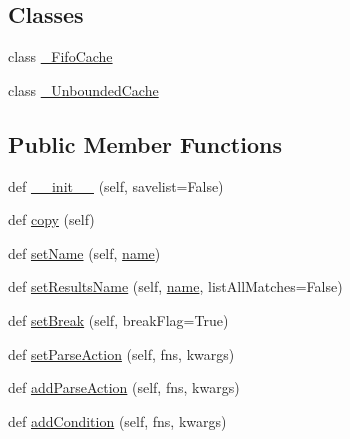 \subsection*{Classes}
\begin{DoxyCompactItemize}
\item 
class \hyperlink{classpip_1_1__vendor_1_1pyparsing_1_1ParserElement_1_1__FifoCache}{\+\_\+\+Fifo\+Cache}
\item 
class \hyperlink{classpip_1_1__vendor_1_1pyparsing_1_1ParserElement_1_1__UnboundedCache}{\+\_\+\+Unbounded\+Cache}
\end{DoxyCompactItemize}
\subsection*{Public Member Functions}
\begin{DoxyCompactItemize}
\item 
def \hyperlink{classpip_1_1__vendor_1_1pyparsing_1_1ParserElement_acee45fab58487158ade314c502148e23}{\+\_\+\+\_\+init\+\_\+\+\_\+} (self, savelist=False)
\item 
def \hyperlink{classpip_1_1__vendor_1_1pyparsing_1_1ParserElement_a75be54cde38c4a6293d9518caf6fc43b}{copy} (self)
\item 
def \hyperlink{classpip_1_1__vendor_1_1pyparsing_1_1ParserElement_a110e6b3f0797a5730f4c0d851314071e}{set\+Name} (self, \hyperlink{classpip_1_1__vendor_1_1pyparsing_1_1ParserElement_a91b7a89a29c2aa6e205a57aad16c8412}{name})
\item 
def \hyperlink{classpip_1_1__vendor_1_1pyparsing_1_1ParserElement_ab7887526af9674a6b7969bd4d9756bf9}{set\+Results\+Name} (self, \hyperlink{classpip_1_1__vendor_1_1pyparsing_1_1ParserElement_a91b7a89a29c2aa6e205a57aad16c8412}{name}, list\+All\+Matches=False)
\item 
def \hyperlink{classpip_1_1__vendor_1_1pyparsing_1_1ParserElement_ac0f15d75e611e997f15adddd10d026ae}{set\+Break} (self, break\+Flag=True)
\item 
def \hyperlink{classpip_1_1__vendor_1_1pyparsing_1_1ParserElement_ac3f85e84152181b62852b9c0f70b1fb4}{set\+Parse\+Action} (self, fns, kwargs)
\item 
def \hyperlink{classpip_1_1__vendor_1_1pyparsing_1_1ParserElement_af122b31c7582cc1f2173ff99e2eed313}{add\+Parse\+Action} (self, fns, kwargs)
\item 
def \hyperlink{classpip_1_1__vendor_1_1pyparsing_1_1ParserElement_ae73a731157475ddfba89da9127dc5937}{add\+Condition} (self, fns, kwargs)
\item 

\end{DoxyCompactItemize}
